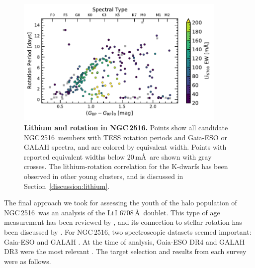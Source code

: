 \documentclass[12pt,twocolumn,tighten]{aastex63}
\newcommand{\cn}{NGC\,2516} %
\begin{document}
\begin{figure}[t]
	\begin{center}
		\leavevmode
		\includegraphics[width=0.9\textwidth]{f5b.pdf}
	\end{center}
	\vspace{-0.7cm}
  \caption{ {\bf Lithium and rotation in NGC\,2516.} Points show all
  candidate \cn\ members with TESS rotation periods and Gaia-ESO or
  GALAH spectra, and are colored by equivalent width.  Points with
  reported equivalent widths below 20\,m\AA\ are shown with gray
  crosses.  The lithium-rotation correlation for the K-dwarfs has been
  observed in other young clusters, and is discussed in
  Section~\ref{discussion:lithium}.
	\label{fig:lithiumrot}
	}
\end{figure}

The final approach we took for assessing the youth of the
halo population of \cn\ was an analysis of the Li\,\textsc{I}
6708\,\AA\ doublet.  This type of age measurement has been reviewed by
\citet{soderblom_ages_2010}, and its connection to stellar rotation
has been discussed by \citet{bouvier_lithium-rotation_2020}.
For \cn, two spectroscopic datasets seemed important:
Gaia-ESO \citep{gilmore_gaiaeso_2012} and GALAH
\citep{silva_galah_2015}.  At the time of analysis, Gaia-ESO DR4 and
GALAH DR3 were the most relevant
\citep{randich_gaiaeso_2018,buder_galah_2020}.  The target selection
and results from each survey were as follows.
\end{document}
